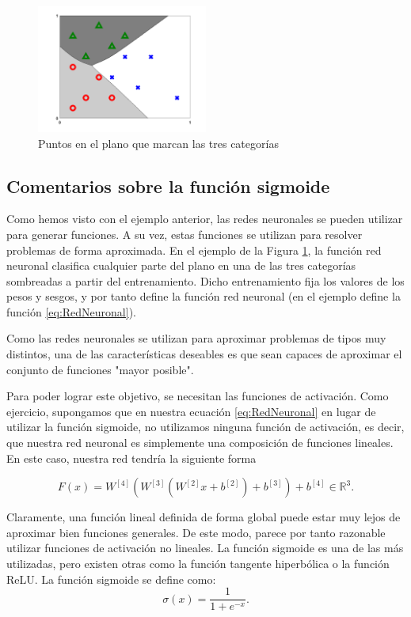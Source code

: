 \documentclass[a4paper,11pt,spanish, twoside, leqno]{tfg-uam}
\theoremstyle{definition}
\begin{document}
\begin{figure}
    \centering
    \includegraphics[width=0.5\textwidth]{Figuras/classifier_back.png}
    \caption{Puntos en el plano que marcan las tres categorías}
    \label{fig:ClasificacionFinal}
\end{figure}

\subsection{Comentarios sobre la función sigmoide}\label{subsec:Sigmoide}
Como hemos visto con el ejemplo anterior, las redes neuronales se pueden utilizar para generar funciones. A su vez, estas funciones se utilizan para resolver problemas de forma aproximada. En el ejemplo de la Figura \ref{fig:ClasificacionFinal}, la función red neuronal clasifica cualquier parte del plano en una de las tres categorías sombreadas a partir del entrenamiento. Dicho entrenamiento fija los valores de los pesos y sesgos, y por tanto define la función red neuronal (en el ejemplo define la función \eqref{eq:RedNeuronal}).

Como las redes neuronales se utilizan para aproximar problemas de tipos muy distintos, una de las características deseables es que sean  capaces de aproximar el conjunto de funciones "mayor posible".

Para poder lograr este objetivo, se necesitan las funciones de activación. Como ejercicio, supongamos que en nuestra ecuación \eqref{eq:RedNeuronal} en lugar de utilizar la función sigmoide, no utilizamos ninguna función de activación, es decir, que nuestra red neuronal es simplemente una composición de funciones lineales. En este caso, nuestra red tendría la siguiente forma

\begin{equation*}
    F(x)=W^{[4]}(W^{[3]}(W^{[2]}x+b^{[2]})+b^{[3]})+b^{[4]}\in\mathbb{R}^3.
\end{equation*}

Claramente, una función lineal definida de forma global puede estar muy lejos de aproximar bien funciones generales. De este modo, parece por tanto razonable utilizar funciones de activación no lineales. La función sigmoide es una de las más utilizadas, pero existen otras como la función tangente hiperbólica o la función ReLU. La función sigmoide se define como:
\begin{equation*}
    \sigma(x)=\frac{1}{1+e^{-x}}.
\end{equation*}
\end{document}
